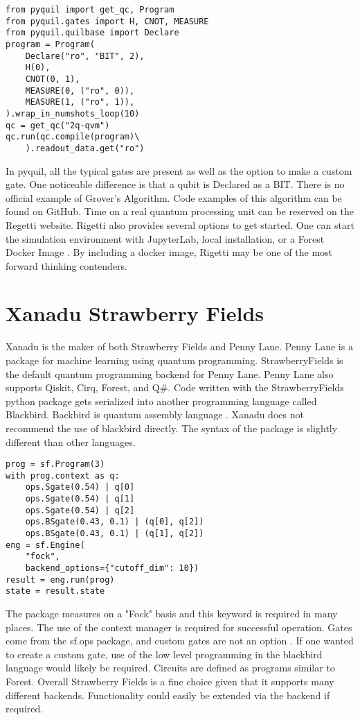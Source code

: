 \documentclass[conference]{IEEEtran}
\begin{document}
\begin{verbatim}
from pyquil import get_qc, Program
from pyquil.gates import H, CNOT, MEASURE
from pyquil.quilbase import Declare
program = Program(
    Declare("ro", "BIT", 2),
    H(0),
    CNOT(0, 1),
    MEASURE(0, ("ro", 0)),
    MEASURE(1, ("ro", 1)),
).wrap_in_numshots_loop(10)
qc = get_qc("2q-qvm")
qc.run(qc.compile(program)\
    ).readout_data.get("ro")
\end{verbatim}

In pyquil, all the typical gates are present as well as the option to make a custom gate. 
One noticeable difference is that a qubit is Declared as a BIT.
There is no official example of Grover's Algorithm.
Code examples of this algorithm can be found on GitHub. 
Time on a real quantum processing unit can be reserved on the Regetti website. 
Rigetti also provides several options to get started. 
One can start the simulation environment with JupyterLab, local installation, or a Forest Docker Image \cite{b14}. 
By including a docker image, Rigetti may be one of the most forward thinking contenders.


\section{Xanadu Strawberry Fields}
Xanadu is the maker of both Strawberry Fields and Penny Lane. Penny Lane is a package for machine learning using quantum programming. StrawberryFields is the default quantum programming backend for Penny Lane. Penny Lane also supports Qiskit, Cirq, Forest, and Q\#.
Code written with the StrawberryFields python package gets serialized into another programming language called Blackbird. Backbird is quantum assembly language \cite{b15}. Xanadu does not recommend the use of blackbird directly.
The syntax of the package is slightly different than other languages. 
\begin{verbatim}
prog = sf.Program(3)
with prog.context as q:
    ops.Sgate(0.54) | q[0]
    ops.Sgate(0.54) | q[1]
    ops.Sgate(0.54) | q[2]
    ops.BSgate(0.43, 0.1) | (q[0], q[2])
    ops.BSgate(0.43, 0.1) | (q[1], q[2])
eng = sf.Engine(
    "fock", 
    backend_options={"cutoff_dim": 10})
result = eng.run(prog)
state = result.state
\end{verbatim}
The package measures on a "Fock" basis and this keyword is required in many places. 
The use of the context manager is required for successful operation.
Gates come from the sf.ops package, and custom gates are not an option \cite{b15}.
If one wanted to create a custom gate, use of the low level programming in the blackbird language would likely be required. 
Circuits are defined as programs similar to Forest.
Overall Strawberry Fields is a fine choice given that it supports many different backends. 
Functionality could easily be extended via the backend if required.
\end{document}
